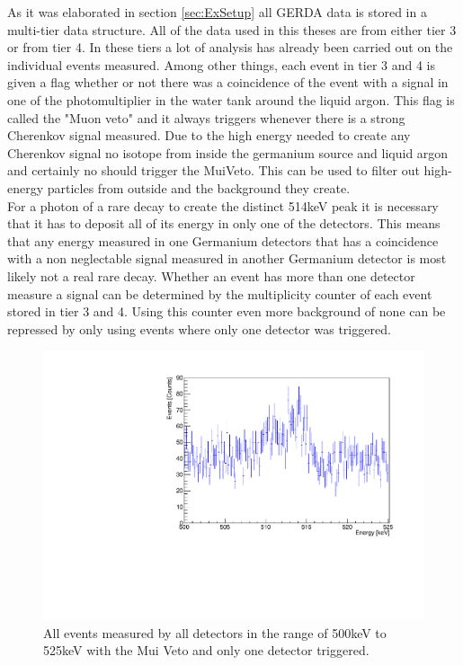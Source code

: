 As it was elaborated in section \ref{sec:ExSetup} all GERDA data is stored in a multi-tier data structure. 
All of the data used in this theses are from either tier 3 or from tier 4.
In these tiers a lot of analysis has already been carried out on the individual events measured. 
Among other things, each event in tier 3 and 4 is given a flag whether or not there was a coincidence of the event with a signal in one of the photomultiplier in the water tank around the liquid argon.
This flag is called the "Muon veto" and it always triggers whenever there is a strong Cherenkov signal measured.
Due to the high energy needed to create any Cherenkov signal no isotope from inside the germanium source and liquid argon and certainly no  should trigger the MuiVeto.
This can be used to filter out high-energy particles from outside and the background they create.
\\

For a photon of a rare  decay to create the distinct 514keV peak it is necessary that it has to deposit all of its energy in only one of the detectors. 
This means that any energy measured in one Germanium detectors that has a coincidence with a non neglectable signal measured in another Germanium detector is most likely not a real rare  decay.
Whether an event has more than one detector measure a signal can be determined by the multiplicity counter of each event stored in tier 3 and 4.
Using this counter even more background of none  can be repressed by only using events where only one detector was triggered.
\\

\begin{figure}[t!]
	\centering
	\ifmakefigures%
	\includegraphics[width=130mm]{./Bilder/500525NoFilterAllDetectors.pdf}
	\fi%
	\caption{\label{fig:leichtGefiltertes500525}
		All events measured by all detectors in the range of 500keV to 525keV with the Mui Veto and only one detector triggered.
	}
\end{figure}

